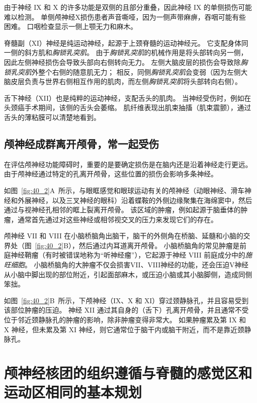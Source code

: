 由于神经 IX 和 X 的许多功能是双侧的且部分重叠，因此神经 IX 的单侧损伤可能难以检测。
单侧颅神经X损伤患者声音嘶哑，因为一侧声带麻痹，吞咽可能有些困难。
口咽检查显示一侧上颚无力和麻木。


脊髓副（XI）神经是纯运动神经，起源于上颈脊髓的运动神经元。
它支配身体同一侧的斜方肌和\textit{胸锁乳突肌}。
由于\textit{胸锁乳突肌}的机械作用是将头部转向另一侧，因此左侧神经损伤会导致头部向右侧转向无力。
左侧大脑皮层的损伤会导致除\textit{胸锁乳突肌}外整个右侧的随意肌无力；
相反，同侧\textit{胸锁乳突肌}会变弱（因为左侧大脑皮层负责与世界右侧相互作用的肌肉，而左侧\textit{胸锁乳突肌}将头部转向右侧）。


舌下神经（XII）也是纯粹的运动神经，支配舌头的肌肉。
当神经受伤时，例如在头颈癌手术期间，该侧的舌头会萎缩。
肌纤维表现出肌束抽搐（肌束震颤），通过舌头的薄粘膜可以清楚地看到。



\subsection{颅神经成群离开颅骨，常一起受伤}

在评估颅神经功能障碍时，重要的是要确定损伤是在脑内还是沿着神经走行更远。
由于颅神经通过特定的孔离开颅骨，这些位置的损伤会影响多条神经。


如图~\ref{fig:40_2}A~所示，与眼眶感觉和眼球运动有关的颅神经（动眼神经、滑车神经和外展神经，以及三叉神经的眼科）沿着蝶鞍的外侧边缘聚集在海绵窦中，然后通过与视神经孔相邻的眶上裂离开颅骨。
该区域的肿瘤，例如起源于脑垂体的肿瘤，通常首先通过对这些神经或相邻视交叉的压力来发现它们的存在。


颅神经 VII 和 VIII 在小脑桥脑角出脑干，脑干的外侧角在桥脑、延髓和小脑的交界处（图~\ref{fig:40_2}B），然后通过内耳道离开颅骨。
小脑桥脑角的常见肿瘤是前庭神经鞘瘤（有时被错误地称为“听神经瘤”），它起源于神经 VIII 前庭成分中的\textit{施旺细胞}。
小脑桥脑角的大肿瘤不仅会损害VII、VIII神经的功能，还会压迫V神经从小脑中脚出现的部位附近，引起面部麻木，或压迫小脑或其小脑脚侧，造成同侧笨拙。


如图~\ref{fig:40_2}B~所示，下颅神经（IX、X 和 XI）穿过颈静脉孔，并且容易受到该部位肿瘤的压迫。
神经 XII 通过其自身的（舌下）孔离开颅骨，并且通常不受位于邻近颈静脉孔的肿瘤的影响，除非肿瘤变得非常大。
如果肿瘤累及第 IX 和 X 神经，但未累及第 XI 神经，则它通常位于脑干内或脑干附近，而不是靠近颈静脉孔。



\section{颅神经核团的组织遵循与脊髓的感觉区和运动区相同的基本规划}

